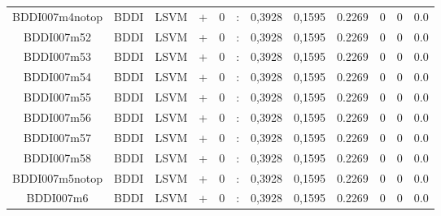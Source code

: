 \documentclass[a4paper]{article}
\begin{document}
\begin{landscape}
\begin{center}
\begin{tabular}{ |c|c|c|c|c|c|c|c|c|c|c|c|}
 	
 
 	
 		
 		\small{ BDDI007m4notop } & BDDI & LSVM & +  &  0 &  :  &  0,3928 & 0,1595 & 0.2269  &  0 & 0 & 0.0 \\
 		

 	
 
 	
 		
 		\small{ BDDI007m52 } & BDDI & LSVM & +  &  0 &  :  &  0,3928 & 0,1595 & 0.2269  &  0 & 0 & 0.0 \\
 		

 	
 
 	
 		
 		\small{ BDDI007m53 } & BDDI & LSVM & +  &  0 &  :  &  0,3928 & 0,1595 & 0.2269  &  0 & 0 & 0.0 \\
 		

 	
 
 	
 		
 		\small{ BDDI007m54 } & BDDI & LSVM & +  &  0 &  :  &  0,3928 & 0,1595 & 0.2269  &  0 & 0 & 0.0 \\
 		

 	
 
 	
 		
 		\small{ BDDI007m55 } & BDDI & LSVM & +  &  0 &  :  &  0,3928 & 0,1595 & 0.2269  &  0 & 0 & 0.0 \\
 		

 	
 
 	
 		
 		\small{ BDDI007m56 } & BDDI & LSVM & +  &  0 &  :  &  0,3928 & 0,1595 & 0.2269  &  0 & 0 & 0.0 \\
 		

 	
 
 	
 		
 		\small{ BDDI007m57 } & BDDI & LSVM & +  &  0 &  :  &  0,3928 & 0,1595 & 0.2269  &  0 & 0 & 0.0 \\
 		

 	
 
 	
 		
 		\small{ BDDI007m58 } & BDDI & LSVM & +  &  0 &  :  &  0,3928 & 0,1595 & 0.2269  &  0 & 0 & 0.0 \\
 		

 	
 
 	
 		
 		\small{ BDDI007m5notop } & BDDI & LSVM & +  &  0 &  :  &  0,3928 & 0,1595 & 0.2269  &  0 & 0 & 0.0 \\
 		

 	
 
 	
 		
 		\small{ BDDI007m6 } & BDDI & LSVM & +  &  0 &  :  &  0,3928 & 0,1595 & 0.2269  &  0 & 0 & 0.0 \\
 		


\end{tabular}
\end{center}
\end{landscape}
\end{document}
